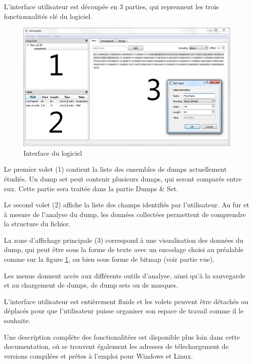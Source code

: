 L'interface utilisateur est découpée en 3 parties, qui reprennent les trois fonctionnalités clé du logiciel.

\begin{figure}[!h]
  \begin{center}
  \includegraphics[width=\textwidth]{interface.png}
  \caption{Interface du logiciel}
  \label{interface}
  \end{center}
\end{figure}

Le premier volet (1) contient la liste des ensembles de dumps actuellement étudiés. Un dump set peut contenir plusieurs dumps, qui seront comparés entre eux. Cette partie sera traitée dans la partie Dumps \& Set.

Le second volet (2) affiche la liste des champs identifiés par l'utilisateur. Au fur et à mesure de l'analyse du dump, les données collectées permettent de comprendre la structure du fichier.

La zone d'affichage principale (3) correspond à une visualisation des données du dump, qui peut être sous la forme de texte avec un encodage choisi au préalable comme sur la figure \ref{interface}, ou bien sous forme de bitmap (voir partie vue).

Les menus donnent accès aux différents outils d'analyse, ainsi qu'à la sauvegarde et au chargement de dumps, de dump sets ou de masques.

L'interface utilisateur est entièrement fluide et les volets peuvent être détachés ou déplacés pour que l'utilisateur puisse organiser son espace de travail comme il le souhaite.

Une description complète des fonctionalitées est disponible plus loin dans cette documentation, où se trouvent également les adresses de télechargement de versions compilées et prêtes à l'emploi pour Windows et Linux.
